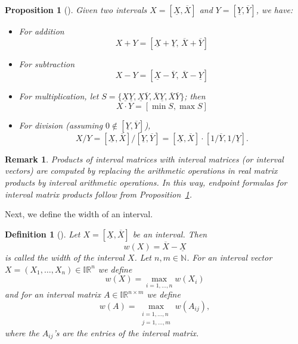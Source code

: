 \documentclass[a4paper, 11pt]{article}
\newtheorem{proposition}[theorem]{Proposition}
\newtheorem{definition}[theorem]{Definition}
\newtheorem{remark}[theorem]{Remark}
\begin{document}
	
	\begin{proposition}[\cite{moore1966interval}]\label{prop: endpoint formulas}
		Given two intervals $X= [\underline{X}, \overline{X}]$ and $Y=[\underline{Y}, \overline{Y}]$, we have:
		\begin{itemize}
			\item For addition
			$$ X+Y = [\underline{X} + \underline{Y}, \,\overline{X} + \overline{Y}]$$
			
			\item For subtraction
			$$ X-Y = [\underline{X}-\overline{Y},\, \overline{X}-\underline{Y}] $$
			
			\item For multiplication, let $S=\{\underline{X}\underline{Y}, \underline{X}\overline{Y}, \overline{X}\underline{Y}, \overline{X}\overline{Y}\}$; then
			$$ X \cdot Y =  [\min S, \max S] $$
			
			\item For division (assuming $0 \notin [\underline{Y}, \overline{Y}]$),
			$$
			X/Y = [\underline{X}, \overline{X}]/[\underline{Y}, \overline{Y}] 
			= [\underline{X}, \overline{X}]\cdot[1/\overline{Y}, 1/\underline{Y}] .
			$$
		\end{itemize}
	\end{proposition}
	\begin{remark}\label{rem:IntervalLinAlg}
		Products of interval matrices with interval matrices (or interval vectors) are computed by replacing the arithmetic operations in real matrix products by interval arithmetic operations. In this way, endpoint formulas for interval matrix products follow from Proposition~\ref{prop: endpoint formulas}.
	\end{remark}
	
	Next, we define the width of an interval.
	\begin{definition}[\cite{moore2009introduction}]
		Let $X = [\underline{X}, \overline{X}]$ be an interval. Then
		\begin{equation}
			w(X) = \overline{X} - \underline{X}
		\end{equation}
		is called the width of the interval $X$. Let $n,m\in \mathbb{N}$. For an interval vector $X=(X_1, \dotsc,X_n)\in \mathbb{IR}^n$ we define
		$$ w(X) = \max_{i=1,\dotsc, n} w(X_i) $$
		and for an interval matrix $A\in \mathbb{IR}^{n\times m}$ we define
		$$ w(A) = \max_{\substack{i=1,\dots,n \\ j=1,\dotsc,m}} w(A_{ij}), $$
		where the $A_{ij}$'s are the entries of the interval matrix.
	\end{definition}
	
\end{document}

